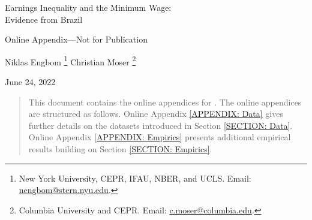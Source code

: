 \documentclass[%
  11pt,%
  american,%
  english,%
  letterpaper%
  ]%
  {article}
\theoremstyle{plain}
\theoremstyle{definition}
\theoremstyle{plain}
\theoremstyle{plain}
\renewcommand{\thetable}{\arabic{table}}
\renewcommand{\thefigure}{\arabic{figure}}
\begin{document}
\appendix
%
%
\renewcommand\thetable{\thesection.\arabic{figure}}
\renewcommand\thefigure{\thesection.\arabic{figure}}
\renewcommand{\thefootnote}{\fnsymbol{footnote}}
%
\begin{spacing}{1.00}
  \clearpage
  \setcounter{page}{1}
  \begin{center}
    \begin{LARGE}
      Earnings Inequality and the Minimum Wage:\\[.1in] Evidence from Brazil \\[.5in]
    \end{LARGE}
    \begin{LARGE}
      Online Appendix---Not for Publication \\[.5in]
    \end{LARGE}
    \begin{large}
      Niklas Engbom%
      \footnote[2]{New York University, CEPR, IFAU, NBER, and UCLS. Email: \href{mailto:nengbom@stern.nyu.edu}{nengbom@stern.nyu.edu}.} %
      \qquad %
      Christian Moser%
      \footnote[3]{Columbia University and CEPR. Email: \href{mailto:c.moser@columbia.edu}{c.moser@columbia.edu}.} %
      \\[.5in]
    \end{large}
    \begin{large}
      June 24, 2022 \\[1in]
    \end{large}
  \end{center}
  \renewcommand*{\thefootnote}{\arabic{footnote}}
  \setcounter{footnote}{0}
  \begin{abstract}
    This document contains the online appendices for . %
    The online appendices are structured as follows. %
    Online Appendix \ref{APPENDIX: Data} gives further details on the datasets introduced in Section \ref{SECTION: Data}. %
    Online Appendix \ref{APPENDIX: Empirics} presents additional empirical results building on Section \ref{SECTION: Empirics}. %

\end{abstract}
\end{spacing}
\end{document}
